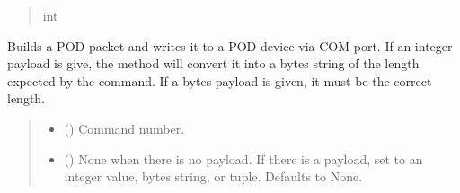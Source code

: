 \documentclass[letterpaper,10pt,english]{sphinxmanual}
\begin{document}
\begin{fulllineitems}
\begin{fulllineitems}
\begin{quote}
\begin{description}
\sphinxAtStartPar
int

\end{description}\end{quote}

\end{fulllineitems}


\begin{fulllineitems}
\label{\detokenize{BasicPodProtocol:BasicPodProtocol.POD_Basics.GetPODpacket}}
\pysigstartsignatures
{}
\pysigstopsignatures
\sphinxAtStartPar
Builds a POD packet and writes it to a POD device via COM port. If an integer payload is give,         the method will convert it into a bytes string of the length expected by the command. If a bytes         payload is given, it must be the correct length.
\begin{quote}\begin{description}
\begin{itemize}
\item {} 
\sphinxAtStartPar
{} (\sphinxstyleliteralemphasis{\sphinxupquote{ | }}) \textendash{} Command number.

\item {} 
\sphinxAtStartPar
{} (\sphinxstyleliteralemphasis{\sphinxupquote{ | }}\sphinxstyleliteralemphasis{\sphinxupquote{ | }}\sphinxstyleliteralemphasis{\sphinxupquote{{[}}}\sphinxstyleliteralemphasis{\sphinxupquote{ | }}\sphinxstyleliteralemphasis{\sphinxupquote{{]}}}\sphinxstyleliteralemphasis{\sphinxupquote{, }}) \textendash{} None when there is no payload. If there                 is a payload, set to an integer value, bytes string, or tuple. Defaults to None.


\end{itemize}
\end{description}
\end{quote}
\end{fulllineitems}
\end{fulllineitems}
\end{document}
